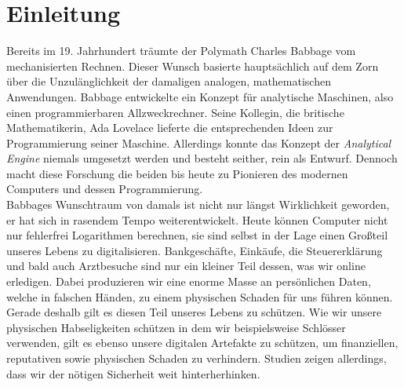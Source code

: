 \documentclass[
    12pt, %
    DIV10,
    ngerman, %
    a4paper, %
    oneside, %
    titlepage, %
    parskip=half, %
    headings=normal, %
    listof=totoc, %
    bibliography=totoc, %
    index=totoc, %
    captions=tableheading, %
    final %
]{scrreprt}
\begin{document}
\chapter{Einleitung}
Bereits im 19. Jahrhundert träumte der Polymath Charles Babbage vom mechanisierten Rechnen. Dieser Wunsch basierte hauptsächlich auf dem Zorn über die Unzulänglichkeit der damaligen analogen, mathematischen Anwendungen. Babbage entwickelte ein Konzept für analytische Maschinen, also einen programmierbaren Allzweckrechner. Seine Kollegin, die britische Mathematikerin, Ada Lovelace lieferte die entsprechenden Ideen zur Programmierung seiner Maschine. Allerdings konnte das Konzept der \emph{Analytical Engine} niemals umgesetzt werden und besteht seither, rein als Entwurf. Dennoch macht diese Forschung die beiden bis heute zu Pionieren des modernen Computers und dessen Programmierung.\\
Babbages Wunschtraum von damals ist nicht nur längst Wirklichkeit geworden, er hat sich in rasendem Tempo weiterentwickelt. Heute können Computer nicht nur fehlerfrei Logarithmen berechnen, sie sind selbst in der Lage einen Großteil unseres Lebens zu digitalisieren. Bankgeschäfte, Einkäufe, die Steuererklärung und bald auch Arztbesuche sind nur ein kleiner Teil dessen, was wir online erledigen. Dabei produzieren wir eine enorme Masse an persönlichen Daten, welche in falschen Händen, zu einem physischen Schaden für uns führen können. Gerade deshalb gilt es diesen Teil unseres Lebens zu schützen. Wie wir unsere physischen Habseligkeiten schützen in dem wir beispielsweise Schlösser verwenden, gilt es ebenso unsere digitalen Artefakte zu schützen, um finanziellen, reputativen sowie physischen Schaden zu verhindern. Studien zeigen allerdings, dass wir der nötigen Sicherheit weit hinterherhinken. 
\end{document}
